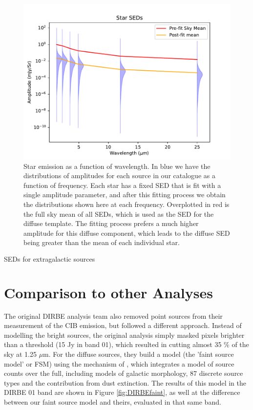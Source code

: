 \documentclass{aa}
\begin{document}
\begin{figure}
  \includegraphics[width=\columnwidth]{figs/starseds/star_seds.pdf}
  \caption{Star emission as a function of wavelength. In blue we have the distributions of amplitudes for each source in our catalogue as a function of frequency. Each star has a fixed SED that is fit with a single amplitude parameter, and after this fitting process we obtain the distributions shown here at each frequency. Overplotted in red is the full sky mean of all SEDs, which is used as the SED for the diffuse template. The fitting process prefers a much higher amplitude for this diffuse component, which leads to the diffuse SED being greater than the mean of each individual star.}
  \label{fig:starSEDs}
\end{figure}

SEDs for extragalactic sources


\section{Comparison to other Analyses}
\label{sec:consistency}

The original DIRBE analysis team \citep{dirbeFaint} also removed point sources from their measurement of the CIB emission, but followed a different approach. Instead of modelling the bright sources, the original analysis simply masked pixels brighter than a threshold (15 Jy in band 01), which resulted in cutting almost 35 \% of the sky at 1.25 $\mu$m. For the diffuse sources, they build a model (the 'faint source model' or FSM) using the mechanism of \cite{wainscoat}, which integrates a model of source counts over the full, including models of galactic morphology, 87 discrete source types and the contribution from dust extinction. The results of this model in the DIRBE 01 band are shown in Figure \ref{fig:DIRBEfaint}, as well at the difference between our faint source model and theirs, evaluated in that same band. 
\end{document}
